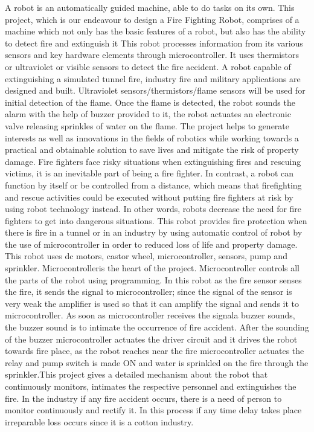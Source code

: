 \documentclass[12pt,a4paper]{report}
\begin{document}
 A robot is an automatically guided machine, able to do tasks on its own. This project, which is our endeavour to design a Fire Fighting Robot, comprises of a machine which not only has the basic features of a robot, but also has the ability to detect fire and extinguish it This robot processes information from its various sensors and key hardware elements through microcontroller. It uses thermistors or ultraviolet or visible sensors to detect the fire accident. A robot capable of extinguishing a simulated tunnel fire, industry fire and military applications are designed and built. Ultraviolet sensors/thermistors/flame sensors will be used for initial detection of the flame. Once the flame is detected, the robot sounds the alarm with the help of buzzer provided to it, the robot actuates an electronic valve releasing sprinkles of water on the flame. The project helps to generate interests as well as innovations in the fields of robotics while working towards a practical and obtainable solution to save lives and mitigate the risk of property damage. Fire fighters face risky situations when extinguishing fires and rescuing victims, it is an inevitable part of being a fire fighter. In contrast, a robot can function by itself or be controlled from a distance, which means that firefighting and rescue activities could be executed without putting fire fighters at risk by using robot technology instead. In other words, robots decrease the need for fire fighters to get into dangerous situations. This robot provides fire protection when there is fire in a tunnel or in an industry by using automatic control of robot by the use of microcontroller in order to reduced loss of life and property damage. This robot uses dc motors, castor wheel, microcontroller, sensors, pump and sprinkler. Microcontrolleris the heart of the project. Microcontroller controls all the parts of the robot using programming. In this robot as
the fire sensor senses the fire, it sends the signal to microcontroller; since the signal of the sensor is very weak
the amplifier is used so that it can amplify the signal and sends it to microcontroller. As soon as microcontroller
receives the signala buzzer sounds, the buzzer sound is to intimate the occurrence of fire accident. After the
sounding of the buzzer microcontroller actuates the driver circuit and it drives the robot towards fire place, as
the robot reaches near the fire microcontroller actuates the relay and pump switch is made ON and water is
sprinkled on the fire through the sprinkler.This project gives a detailed mechanism about the robot that continuously monitors, intimates the respective personnel and extinguishes the fire. In the industry if any fire accident occurs, there is a need of person to monitor continuously and rectify it. In this process if any time delay takes place irreparable loss occurs since it is a cotton industry. 
\end{document}

